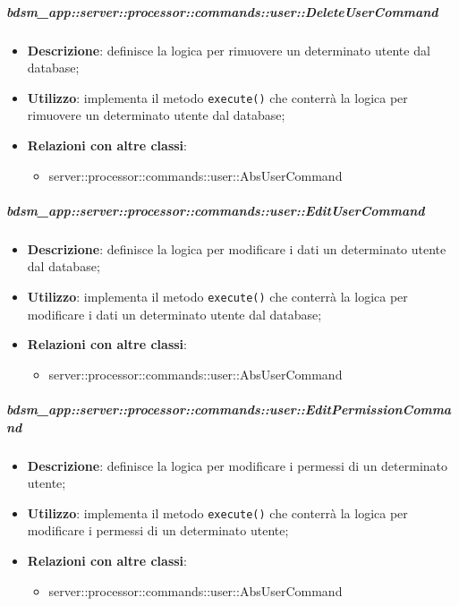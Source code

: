         \subparagraph{bdsm\_app::server::processor::commands::user::DeleteUserCommand} %
        \label{subp:bdsm_app_server_processor_commands_user_deleteusercommand}
        \begin{itemize}
          \item \textbf{Descrizione}: definisce la logica per rimuovere un determinato utente dal database;
          \item \textbf{Utilizzo}: implementa il metodo \texttt{execute()} che conterrà la logica per rimuovere un determinato utente dal database;
          \item \textbf{Relazioni con altre classi}:
            \begin{itemize}
              \item server::processor::commands::user::AbsUserCommand
            \end{itemize}
        \end{itemize}

        \subparagraph{bdsm\_app::server::processor::commands::user::EditUserCommand} %
        \label{subp:bdsm_app_server_processor_commands_user_editusercommand}
        \begin{itemize}
          \item \textbf{Descrizione}: definisce la logica per modificare i dati un determinato utente dal database;
          \item \textbf{Utilizzo}: implementa il metodo \texttt{execute()} che conterrà la logica per modificare i dati un determinato utente dal database;
          \item \textbf{Relazioni con altre classi}:
            \begin{itemize}
              \item server::processor::commands::user::AbsUserCommand
            \end{itemize}
        \end{itemize}

        \subparagraph{bdsm\_app::server::processor::commands::user::EditPermissionCommand} %
        \label{subp:bdsm_app_server_processor_commands_user_editpermissioncommand}
        \begin{itemize}
          \item \textbf{Descrizione}: definisce la logica per modificare i permessi di un determinato utente;
          \item \textbf{Utilizzo}: implementa il metodo \texttt{execute()} che conterrà la logica per modificare i permessi di un determinato utente;
          \item \textbf{Relazioni con altre classi}:
            \begin{itemize}
              \item server::processor::commands::user::AbsUserCommand
            \end{itemize}
        \end{itemize}

